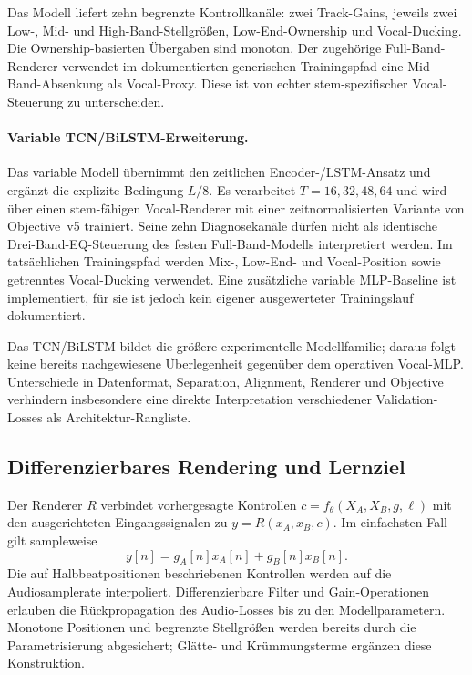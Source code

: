 Das Modell liefert zehn begrenzte Kontrollkanäle: zwei Track-Gains, jeweils zwei Low-, Mid- und High-Band-Stellgrößen, Low-End-Ownership und Vocal-Ducking. Die Ownership-basierten Übergaben sind monoton. Der zugehörige Full-Band-Renderer verwendet im dokumentierten generischen Trainingspfad eine Mid-Band-Absenkung als Vocal-Proxy. Diese ist von echter stem-spezifischer Vocal-Steuerung zu unterscheiden.

\paragraph{Variable TCN/BiLSTM-Erweiterung.}
Das variable Modell übernimmt den zeitlichen Encoder-/LSTM-Ansatz und ergänzt die explizite Bedingung $L/8$. Es verarbeitet $T=16,32,48,64$ und wird über einen stem-fähigen Vocal-Renderer mit einer zeitnormalisierten Variante von Objective~v5 trainiert. Seine zehn Diagnosekanäle dürfen nicht als identische Drei-Band-EQ-Steuerung des festen Full-Band-Modells interpretiert werden. Im tatsächlichen Trainingspfad werden Mix-, Low-End- und Vocal-Position sowie getrenntes Vocal-Ducking verwendet. Eine zusätzliche variable MLP-Baseline ist implementiert, für sie ist jedoch kein eigener ausgewerteter Trainingslauf dokumentiert.

Das TCN/BiLSTM bildet die größere experimentelle Modellfamilie; daraus folgt keine bereits nachgewiesene Überlegenheit gegenüber dem operativen Vocal-MLP. Unterschiede in Datenformat, Separation, Alignment, Renderer und Objective verhindern insbesondere eine direkte Interpretation verschiedener Validation-Losses als Architektur-Rangliste.

\subsection{Differenzierbares Rendering und Lernziel}
\label{sec:methodik-renderer}

Der Renderer $R$ verbindet vorhergesagte Kontrollen $c=f_\theta(X_A,X_B,g,\ell)$ mit den ausgerichteten Eingangssignalen zu $y=R(x_A,x_B,c)$. Im einfachsten Fall gilt sampleweise
\begin{equation}
 y[n]=g_A[n]x_A[n]+g_B[n]x_B[n].
\end{equation}
Die auf Halbbeatpositionen beschriebenen Kontrollen werden auf die Audiosamplerate interpoliert. Differenzierbare Filter und Gain-Operationen erlauben die Rückpropagation des Audio-Losses bis zu den Modellparametern. Monotone Positionen und begrenzte Stellgrößen werden bereits durch die Parametrisierung abgesichert; Glätte- und Krümmungsterme ergänzen diese Konstruktion.

